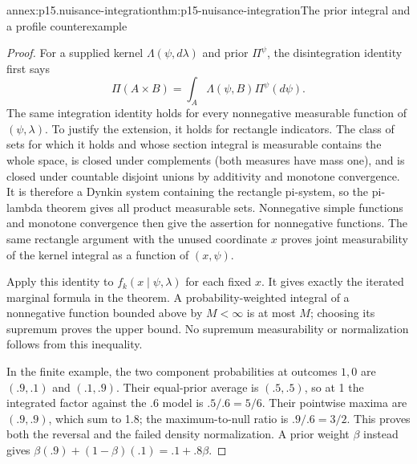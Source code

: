 \begin{annexitem}{annex:p15.nuisance-integration}{thm:p15-nuisance-integration}{The prior integral and a profile counterexample}
\begin{proof}
For a supplied kernel \(\Lambda(\psi,d\lambda)\) and prior \(\Pi^\psi\),
the disintegration identity first says
\[
 \Pi(A\times B)=\int_A \Lambda(\psi,B)\Pi^\psi(d\psi).
\]
The same integration identity holds for every nonnegative measurable
function of \((\psi,\lambda)\). To justify the extension, it holds for
rectangle indicators. The class of sets for which it holds and whose
section integral is measurable contains the whole space, is closed under
complements (both measures have mass one), and is closed under countable
disjoint unions by additivity and monotone convergence. It is therefore
a Dynkin system containing the rectangle pi-system, so the pi-lambda
theorem gives all product measurable sets. Nonnegative simple functions and monotone convergence
then give the assertion for nonnegative functions. The same rectangle
argument with the unused coordinate \(x\) proves joint measurability of
the kernel integral as a function of \((x,\psi)\).

Apply this identity to \(f_k(x\mid\psi,\lambda)\) for each fixed \(x\).
It gives exactly the iterated marginal formula in the theorem.
A probability-weighted integral of a nonnegative function bounded above
by \(M<\infty\) is at most \(M\); choosing its supremum proves the
upper bound. No supremum measurability or normalization follows from this
inequality.

In the finite example, the two component probabilities at outcomes
\(1,0\) are \((.9,.1)\) and \((.1,.9)\). Their equal-prior average
is \((.5,.5)\), so at 1 the integrated factor against the .6 model is
\(.5/.6=5/6\). Their pointwise maxima are \((.9,.9)\), which sum to
1.8; the maximum-to-null ratio is \(.9/.6=3/2\).
This proves both the reversal and the failed density normalization.
A prior weight \(\beta\) instead gives
\(\beta(.9)+(1-\beta)(.1)=.1+.8\beta\).
\end{proof}
\end{annexitem}

